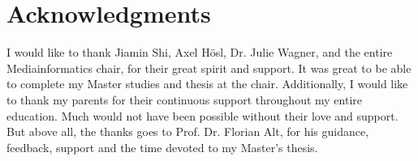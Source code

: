 
\section*{Acknowledgments}

I would like to thank Jiamin Shi, Axel H{\"o}sl, Dr. Julie Wagner, and the entire Mediainformatics chair, for their great spirit and support. It was great to be able to complete my Master studies and thesis at the chair. Additionally, I would like to thank my parents for their continuous support throughout my entire education. Much would not have been possible without their love and support. But above all, the thanks goes to Prof. Dr. Florian Alt, for his guidance, feedback, support and the time devoted to my Master's thesis.
